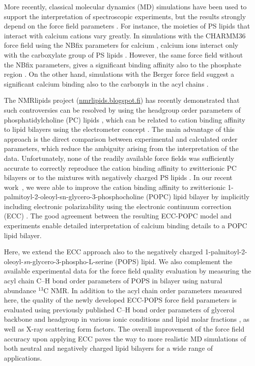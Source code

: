 \documentclass[journal=jctcce,manuscript=article]{achemso}
\begin{document}
More recently, classical molecular dynamics (MD) simulations
have been used to support the interpretation of spectroscopic experiments,
but the results strongly depend on the force field parameters \cite{boettcher11,kucerka14,melcrova16,hallock18,valentine18}.
For instance, the moieties of PS lipids that interact with calcium cations vary greatly.
In simulations with the CHARMM36 force field \cite{klauda10,venable13} using the NBfix parameters for calcium \cite{kim16}, 
calcium ions interact only with the carboxylate group of PS lipids \cite{valentine18}.
However, the same force field without the NBfix parameters, gives a significant binding affinity also to the phosphate region \cite{hallock18}.
On the other hand, simulations with the Berger force field \cite{berger97,mukhopadhyay04}
suggest a significant calcium binding also to the carbonyls in the acyl chains \cite{melcrova16}.

The NMRlipids project (\url{nmrlipids.blogspot.fi}) has recently demonstrated
that such controversies can be resolved by using the headgroup order parameters
of phosphatidylcholine (PC) lipids \cite{catte16, NMRlipidsIV}, which can
be related to cation binding affinity to lipid bilayers using the electrometer
concept \cite{akutsu81,altenbach84,seelig87}. The main advantage of this approach
is the direct comparison between experimental and calculated order parameters,
which reduce the ambiguity arising from the interpretation of the data.
Unfortunately, none of the readily available force fields was sufficiently accurate to correctly reproduce the
cation binding affinity to zwitterionic PC bilayers \cite{catte16} or to the
mixtures with negatively charged PS lipids \cite{NMRlipidsIV}.
In our recent work~\cite{melcr18}, we were able to improve the cation binding affinity
to zwitterionic 1-palmitoyl-2-oleoyl-sn-glycero-3-phosphocholine (POPC) lipid bilayer
by implicitly including electronic polarizability using the electronic continuum
correction (ECC) \cite{leontyev09}. The good agreement between the resulting ECC-POPC
model and experiments enable detailed interpretation of calcium binding details to a POPC lipid bilayer.

Here, we extend the ECC approach also to the negatively charged 1-palmitoyl-2-oleoyl-{\it sn}-glycero-3-phospho-L-serine (POPS) lipid.
We also complement the available experimental data for the force field quality
evaluation by measuring the acyl chain C--H bond order parameters of POPS in bilayer using natural abundance $^{13}$C NMR.
In addition to the acyl chain order parameters measured here, the quality of the newly developed ECC-POPS force field parameters is
evaluated using previously published C--H bond order parameters of glycerol backbone and headgroup in various ionic
conditions and lipid molar fractions \cite{roux90,NMRlipidsIV}, as well as X-ray scattering form factors\cite{kucerka14}.
The overall improvement of the force field accuracy upon applying ECC
paves the way to more realistic MD simulations 
of both neutral and negatively charged lipid bilayers 
for a wide range of applications.
\end{document}
